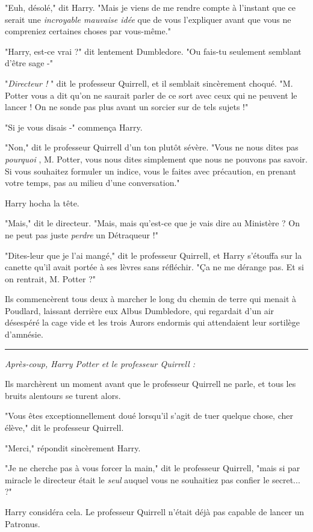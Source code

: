 "Euh, désolé," dit Harry. "Mais je viens de me rendre compte à l'instant que ce serait une \emph{incroyable mauvaise idée}  que de vous l'expliquer avant que vous ne compreniez certaines choses par vous-même."

"Harry, est-ce vrai ?" dit lentement Dumbledore. "Ou fais-tu seulement semblant d'être sage -"

"\emph{Directeur !} " dit le professeur Quirrell, et il semblait sincèrement choqué. "M. Potter vous a dit qu'on ne saurait parler de ce sort avec ceux qui ne peuvent le lancer ! On ne sonde pas plus avant un sorcier sur de tels sujets !"

"Si je vous disais -" commença Harry.

"Non," dit le professeur Quirrell d'un ton plutôt sévère. "Vous ne nous dites pas \emph{pourquoi} , M. Potter, vous nous dites simplement que nous ne pouvons pas savoir. Si vous souhaitez formuler un indice, vous le faites avec précaution, en prenant votre temps, pas au milieu d'une conversation."

Harry hocha la tête.

"Mais," dit le directeur. "Mais, mais qu'est-ce que je vais dire au Ministère ? On ne peut pas juste \emph{perdre}  un Détraqueur !"

"Dites-leur que je l'ai mangé," dit le professeur Quirrell, et Harry s'étouffa sur la canette qu'il avait portée à ses lèvres sans réfléchir. "Ça ne me dérange pas. Et si on rentrait, M. Potter ?"

Ils commencèrent tous deux à marcher le long du chemin de terre qui menait à Poudlard, laissant derrière eux Albus Dumbledore, qui regardait d'un air désespéré la cage vide et les trois Aurors endormis qui attendaient leur sortilège d'amnésie.
\par\noindent\rule{\textwidth}{0.4pt}
\emph{Après-coup, Harry Potter et le professeur Quirrell :} 

Ils marchèrent un moment avant que le professeur Quirrell ne parle, et tous les bruits alentours se turent alors.

"Vous êtes exceptionnellement doué lorsqu'il s'agit de tuer quelque chose, cher élève," dit le professeur Quirrell.

"Merci," répondit sincèrement Harry.

"Je ne cherche pas à vous forcer la main," dit le professeur Quirrell, "mais si par miracle le directeur était le \emph{seul}  auquel vous ne souhaitiez pas confier le secret... ?"

Harry considéra cela. Le professeur Quirrell n'était déjà pas capable de lancer un Patronus.

